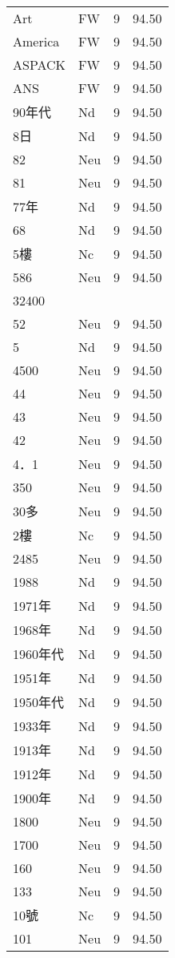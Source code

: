 \documentclass[twocolumn]{book}
\begin{document}
\begin{supertabular}{llrr}
Art & FW & 9 &  94.50\\
America & FW & 9 &  94.50\\
ASPACK & FW & 9 &  94.50\\
ANS & FW & 9 &  94.50\\
90年代 & Nd & 9 &  94.50\\
8日 & Nd & 9 &  94.50\\
82 & Neu & 9 &  94.50\\
81 & Neu & 9 &  94.50\\
77年 & Nd & 9 &  94.50\\
68 & Nd & 9 &  94.50\\
5樓 & Nc & 9 &  94.50\\
586 & Neu & 9 &  94.50\\
32400\\
52 & Neu & 9 &  94.50\\
5 & Nd & 9 &  94.50\\
4500 & Neu & 9 &  94.50\\
44 & Neu & 9 &  94.50\\
43 & Neu & 9 &  94.50\\
42 & Neu & 9 &  94.50\\
4．1 & Neu & 9 &  94.50\\
350 & Neu & 9 &  94.50\\
30多 & Neu & 9 &  94.50\\
2樓 & Nc & 9 &  94.50\\
2485 & Neu & 9 &  94.50\\
1988 & Nd & 9 &  94.50\\
1971年 & Nd & 9 &  94.50\\
1968年 & Nd & 9 &  94.50\\
1960年代 & Nd & 9 &  94.50\\
1951年 & Nd & 9 &  94.50\\
1950年代 & Nd & 9 &  94.50\\
1933年 & Nd & 9 &  94.50\\
1913年 & Nd & 9 &  94.50\\
1912年 & Nd & 9 &  94.50\\
1900年 & Nd & 9 &  94.50\\
1800 & Neu & 9 &  94.50\\
1700 & Neu & 9 &  94.50\\
160 & Neu & 9 &  94.50\\
133 & Neu & 9 &  94.50\\
10號 & Nc & 9 &  94.50\\
101 & Neu & 9 &  94.50\\

\end{supertabular}
\end{document}
